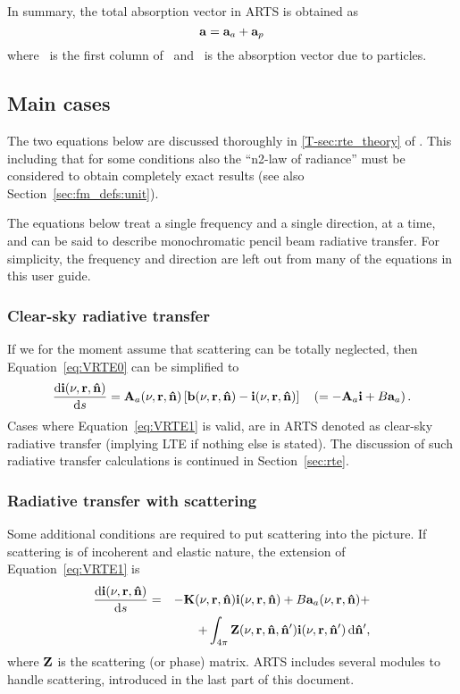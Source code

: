 In summary, the total absorption vector in ARTS is obtained as
\begin{equation}
  \label{eq:evec3}
  {\bf a} = {\bf a}_{a} + {\bf a}_{p}
\end{equation}
where \ is the first column of \, and \ is the
absorption vector due to particles.




\subsection{Main cases}
\label{sec:rteq:cases}
%
The two equations below are discussed thoroughly in \ref{T-sec:rte_theory} of
\theory. This including that for some conditions also the ``n2-law of
radiance'' must be considered to obtain completely exact results (see also
Section~\ref{sec:fm_defs:unit}).

The equations below treat a single frequency and a single direction,
at a time, and can be said to describe monochromatic pencil beam radiative
transfer. For simplicity, the frequency and direction are left out from many of
the equations in this user guide.

\subsubsection{Clear-sky radiative transfer}
%
If we for the moment assume that scattering can be totally neglected, then
Equation~\ref{eq:VRTE0} can be simplified to
\begin{equation}
  \label{eq:VRTE1}
  \frac{\mathrm{d}{\bf i}(\nu,{\bf r},{\bf \hat{n}})}{\mathrm{d} s} =
  {\bf A}_{a}(\nu,{\bf r},{\bf \hat{n}})\left[ {\bf b}(\nu,{\bf r},{\bf \hat{n}})- 
  {\bf i}(\nu,{\bf r},{\bf \hat{n}})\right] \quad 
  \left( = -{\bf A}_{a}{\bf i} + B{\bf a}_{a}\right).
\end{equation}
Cases where Equation~\ref{eq:VRTE1} is valid, are in ARTS denoted as clear-sky
radiative transfer (implying LTE if nothing else is stated). The discussion of
such radiative transfer calculations is continued in Section~\ref{sec:rte}.


\subsubsection{Radiative transfer with scattering}
%
Some additional conditions are required to put scattering into the picture. If
scattering is of incoherent and elastic nature, the extension of 
Equation~\ref{eq:VRTE1} is
\begin{eqnarray}
  \label{eq:VRTE2}
  \frac {\mathrm{d}{\bf i}(\nu,{\bf r},{\bf \hat{n}})}{\mathrm{d} s} &=&
    -{\bf K}(\nu,{\bf r},{\bf \hat{n}}) {\bf i}(\nu,{\bf r},{\bf \hat{n}}) +
     B{\bf a}_{a}(\nu,{\bf r},{\bf \hat{n}}) + \\ \nonumber
    &&+ \int_{4\pi} {\bf Z}(\nu,{\bf r},{\bf \hat{n}},{\bf \hat{n}}')
    {\bf i}(\nu,{\bf r},{\bf \hat{n}}')\,\mathrm{d}{\bf \hat{n}}' ,
\end{eqnarray}
where ${\bf Z}$ is the scattering (or phase) matrix.  ARTS includes several
modules to handle scattering, introduced in the last part of this document.\\





